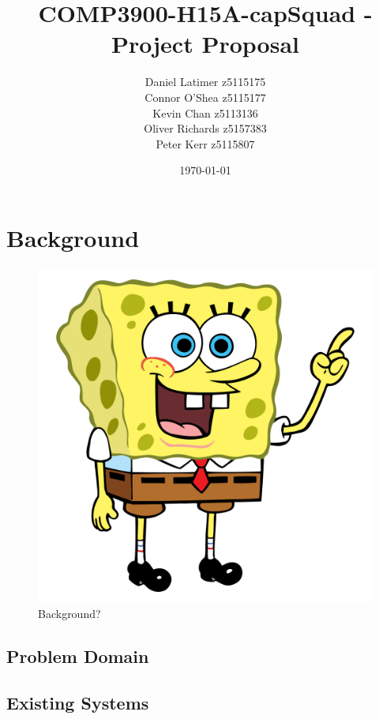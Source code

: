 \documentclass[12pt]{article}
\title{COMP3900-H15A-capSquad - Project Proposal}
\date{\today}
\author{Daniel Latimer z5115175 \\ Connor O'Shea z5115177 \\ Kevin Chan z5113136 \\ Oliver Richards z5157383 \\ Peter Kerr z5115807}
\begin{document}
\maketitle
\tableofcontents
\newpage

\section{Background}

\begin{figure}
    \includegraphics[width=\textwidth]{resources/spongebob}
    \caption{Background? \cite{Laird2012}}
    \label{fig:background}
\end{figure} 

\subsection{Problem Domain}
\subsection{Existing Systems}

\end{document}
